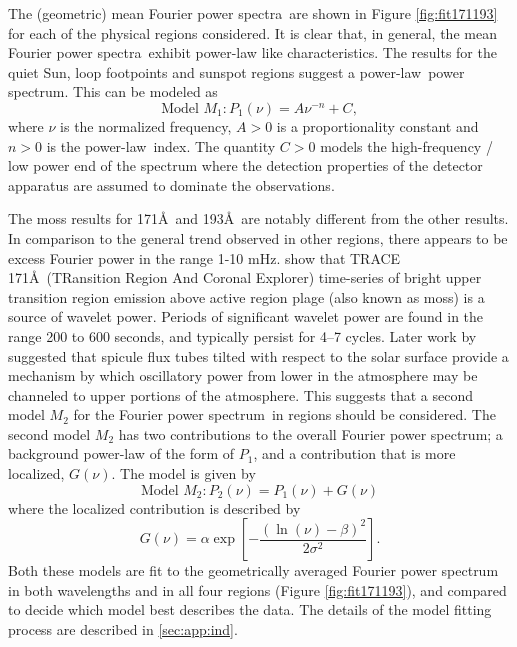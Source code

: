 \documentclass{aastex}
\newcommand{\PS}{power spectrum}
\newcommand{\PA}{power spectra}
\newcommand{\PL}{power-law}
\newcommand{\Fps}{Fourier \PS}
\newcommand{\mFpa}{mean Fourier \PA}
\begin{document}
The (geometric) \mFpa\ are shown in Figure \ref{fig:fit171193} for
each of the physical regions considered.  It is clear that, in
general, the \mFpa\ exhibit power-law like characteristics.  The
results for the quiet Sun, loop footpoints and sunspot regions suggest
a \PL\ \PS.  This can be modeled as
\begin{equation}
\label{eqn:pwrlaw}
\mbox{Model $M_{1}$}: P_{1}(\nu) = A\nu^{-n} + C,
\end{equation}
where $\nu$ is the normalized frequency, $A>0$ is a proportionality
constant and $n>0$ is the \PL\ index.  The quantity $C>0$ models
the high-frequency / low power end of the spectrum where the detection
properties of the detector apparatus are assumed to dominate the
observations.

The moss results for 171\AA\ and 193\AA\ are notably different from
the other results.  In comparison to the general trend observed in
other regions, there appears to be excess Fourier power in the range
1-10 mHz.  \cite{2003ApJ...595L..63D} show that TRACE
171\AA\ (TRansition Region And Coronal Explorer) time-series of bright
upper transition region emission above active region plage (also known
as moss) is a source of wavelet power. Periods of significant wavelet
power are found in the range 200 to 600 seconds, and typically persist
for 4–7 cycles.  Later work by \cite{2005ApJ...624L..61D} suggested
that spicule flux tubes tilted with respect to the solar surface
provide a mechanism by which oscillatory power from lower in the
atmosphere may be channeled to upper portions of the atmosphere.  This
suggests that a second model $M_{2}$ for the \Fps\ in regions should
be considered.  The second model $M_{2}$ has two contributions to the
overall \Fps; a background power-law of the form of $P_{1}$, and a
contribution that is more localized, $G(\nu)$.  The model is given by
\begin{equation}
\label{eqn:pwrlawbump}
\mbox{Model $M_{2}$}: P_{2}(\nu) = P_{1}(\nu) + G(\nu)
\end{equation}
where the localized contribution is described by
\begin{equation}
\label{eqn:bump}
G(\nu) = \alpha\exp\left[-\frac{(\ln(\nu)-\beta)^{2}}{2\sigma^{2}}\right].
\end{equation}
Both these models are fit to the geometrically averaged Fourier power
spectrum in both wavelengths and in all four regions (Figure
\ref{fig:fit171193}), and compared to decide which model best
describes the data. The details of the model fitting process are
described in \ref{sec:app:ind}.
\end{document}
